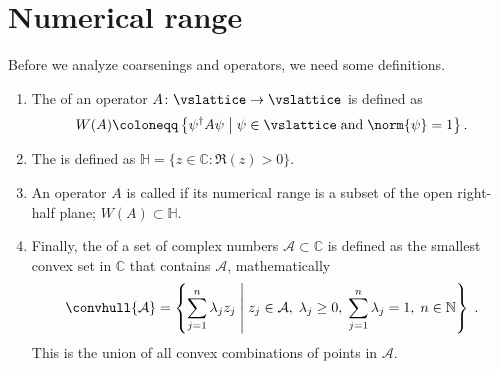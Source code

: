 \section{Numerical range}

Before we analyze coarsenings and operators, we need some definitions.

\begin{enumerate}
\item{
The  of an operator $A \colon \vslattice \rightarrow \vslattice$ is defined as
\begin{align} \label{eq:def:numerical:range}
W(A) \coloneqq \left\{ \psi^\dagger A \psi \; \middle| \; \psi \in \vslattice \; \text{and} \; \norm{\psi} = 1 \right\}.
\end{align}
}
\item{The  is defined as $\mathbb{H} = \{ z \in \mathbb{C} \colon \Re(z) > 0 \}$.}
\item{An operator $A$ is called  if its numerical range is a subset of the open right-half plane; $W(A) \subset \mathbb{H}$.}
\item{
Finally, the  of a set of complex numbers $\mathcal{A} \subset \mathbb{C}$ is defined as the smallest convex set in $\mathbb{C}$ that contains $\mathcal{A}$, mathematically
\begin{equation}
\convhull{\mathcal{A}} = \left\{
    \sum_{j=1}^{n} \lambda_j z_j
    \; \middle| \;
    z_j \in \mathcal{A}, \;
    \lambda_j \geq 0, \;
    \sum_{j=1}^{n} \lambda_j = 1, \;
    n \in \mathbb{N}
\right\} \;.
\end{equation}
This is the union of all convex combinations of points in $\mathcal{A}$.
}
\end{enumerate}


